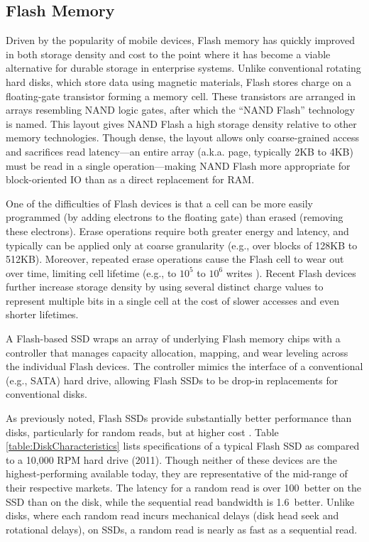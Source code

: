 \subsection{Flash Memory}
\label{sec:Background:Storage:Flash}
Driven by the popularity of mobile devices, Flash memory has quickly improved in both storage density and cost to the point where it has become a viable alternative for durable storage in enterprise systems.
Unlike conventional rotating hard disks, which store data using magnetic materials, Flash stores charge on a floating-gate transistor forming a memory cell.
These transistors are arranged in arrays resembling NAND logic gates, after which the ``NAND Flash'' technology is named.
This layout gives NAND Flash a high storage density relative to other memory technologies.
Though dense, the layout allows only coarse-grained access and sacrifices read latency---an entire array (a.k.a. page, typically 2KB to 4KB) must be read in a single operation---making NAND Flash more appropriate for block-oriented IO than as a direct replacement for RAM.  

One of the difficulties of Flash devices is that a cell can be more easily programmed (by adding electrons to the floating gate) than erased (removing these electrons).  
Erase operations require both greater energy and latency, and typically can be applied only at coarse granularity (e.g., over blocks of 128KB to 512KB).
Moreover, repeated erase operations cause the Flash cell to wear out over time, limiting cell lifetime (e.g., to $10^5$ to $10^6$ writes \cite{Roberts2009}).  
Recent Flash devices further increase storage density by using several distinct charge values to represent multiple bits in a single cell at the cost of slower accesses and even shorter lifetimes.

A Flash-based SSD wraps an array of underlying Flash memory chips with a controller that manages capacity allocation, mapping, and wear leveling across the individual Flash devices.  
The controller mimics the interface of a conventional (e.g., SATA) hard drive, allowing Flash SSDs to be drop-in replacements for conventional disks.
      
As previously noted, Flash SSDs provide substantially better performance than disks, particularly for random reads, but at higher cost \cite{BoboilaDesoyers11}.
Table \ref{table:DiskCharacteristics} lists specifications of a typical Flash SSD as compared to a 10,000 RPM hard drive (2011).
Though neither of these devices are the highest-performing available today, they are representative of the mid-range of their respective markets.
The latency for a random read is over 100\texttimes~better on the SSD than on the disk, while the sequential read bandwidth is 1.6\texttimes~better. 
Unlike disks, where each random read incurs mechanical delays (disk head seek and rotational delays), on SSDs, a random read is nearly as fast as a sequential read.  


